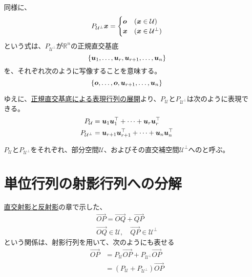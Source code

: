 \documentclass[../../../topic_linear-algebra]{subfiles}
\begin{document}
\br

同様に、
\begin{equation*}
  P_{\mathcal{U}^{\perp}}\vb*{x} = \begin{cases}
    \vb*{o} & (\vb*{x} \in \mathcal{U})         \\
    \vb*{x} & (\vb*{x} \in \mathcal{U}^{\perp})
  \end{cases}
\end{equation*}
という式は、$P_{\mathcal{U}^{\perp}}$が$\mathbb{R}^n$の正規直交基底
\begin{equation*}
  \{ \vb*{u}_1, \ldots, \vb*{u}_r, \vb*{u}_{r+1}, \ldots, \vb*{u}_n \}
\end{equation*}
を、それぞれ次のように写像することを意味する。
\begin{equation*}
  \{ \vb*{o}, \ldots, \vb*{o}, \vb*{u}_{r+1}, \ldots, \vb*{u}_n \}
\end{equation*}

\br

ゆえに、\hyperref[thm:orthobasis-formula-for-rep-matrix]{正規直交基底による表現行列の展開}より、$P_{\mathcal{U}}$と$P_{\mathcal{U}^{\perp}}$は次のように表現できる。
\begin{align*}
  P_{\mathcal{U}}         & = \vb*{u}_1 \vb*{u}_1^\top + \cdots + \vb*{u}_r \vb*{u}_r^\top         \\
  P_{\mathcal{U}^{\perp}} & = \vb*{u}_{r+1} \vb*{u}_{r+1}^\top + \cdots + \vb*{u}_n \vb*{u}_n^\top
\end{align*}

$P_{\mathcal{U}}$と$P_{\mathcal{U}^{\perp}}$をそれぞれ、部分空間$\mathcal{U}$、およびその直交補空間$\mathcal{U}^{\perp}$へのと呼ぶ。

\sectionline
\section{単位行列の射影行列への分解}

\hyperref[sec:orthogonal-projection-and-reflection]{直交射影と反射影}の章で示した、
\begin{gather*}
  \overrightarrow{OP} = \overrightarrow{OQ} + \overrightarrow{QP} \\
  \overrightarrow{OQ} \in \mathcal{U}, \quad \overrightarrow{QP} \in \mathcal{U}^\perp
\end{gather*}
という関係は、射影行列を用いて、次のようにも表せる
\begin{align*}
  \overrightarrow{OP} & = P_{\mathcal{U}}\overrightarrow{OP} + P_{\mathcal{U}^{\perp}}\overrightarrow{OP} \\
                      & = (P_{\mathcal{U}} + P_{\mathcal{U}^{\perp}})\overrightarrow{OP}
\end{align*}
\end{document}
